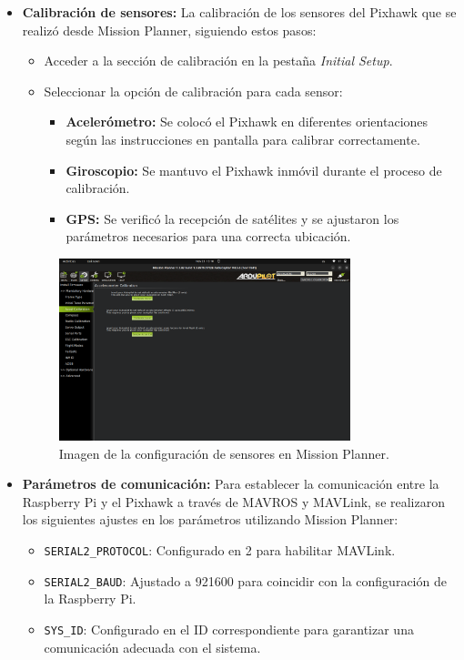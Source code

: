 \begin{itemize}
        \item \textbf{Calibración de sensores:} 
        La calibración de los sensores del Pixhawk que se realizó desde Mission Planner, siguiendo estos pasos:
        \begin{itemize}
            \item Acceder a la sección de calibración en la pestaña \textit{Initial Setup}.
            \item Seleccionar la opción de calibración para cada sensor:
            \begin{itemize}
                \item \textbf{Acelerómetro:} Se colocó el Pixhawk en diferentes orientaciones según las instrucciones en pantalla para calibrar correctamente.
                \item \textbf{Giroscopio:} Se mantuvo el Pixhawk inmóvil durante el proceso de calibración.
                \item \textbf{GPS:} Se verificó la recepción de satélites y se ajustaron los parámetros necesarios para una correcta ubicación.
            \end{itemize}
        \end{itemize}
        \begin{figure}
            \centering
            \includegraphics[width=0.8\textwidth]{pictures/mp_calibration.png}
            \caption{Imagen de la configuración de sensores en Mission Planner.}
        \end{figure}

        
        \item \textbf{Parámetros de comunicación:} 
        Para establecer la comunicación entre la Raspberry Pi y el Pixhawk a través de MAVROS y MAVLink, se realizaron los siguientes ajustes en los parámetros utilizando Mission Planner:
        \begin{itemize}
            \item \texttt{SERIAL2\_PROTOCOL}: Configurado en 2 para habilitar MAVLink.
            \item \texttt{SERIAL2\_BAUD}: Ajustado a 921600 para coincidir con la configuración de la Raspberry Pi.
            \item \texttt{SYS\_ID}: Configurado en el ID correspondiente para garantizar una comunicación adecuada con el sistema.
        \end{itemize}
    
    \end{itemize}
    

